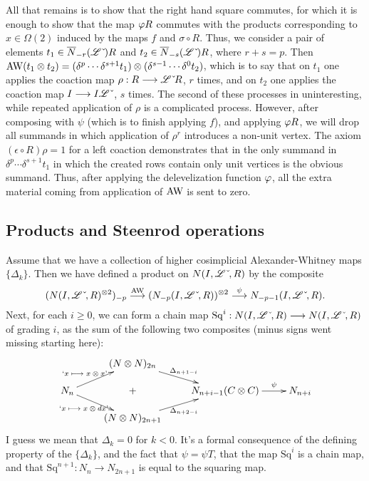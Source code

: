 \documentclass[10pt]{article}
\newcommand{\Sq}{\mathrm{Sq}}
\newcommand{\dual}{\,\check{\,}}
\newcommand{\LieOperad}{\scrL}
\newcommand{\dualLieOperad}{\LieOperad\dual}
\begin{document}
\begin{PRlieKoszulComplexCalculation}
All that remains is to show that the right hand square commutes, for which it is enough to show that the map $\oldphi\circ R$ commutes with the products corresponding to $x\in\Omega(2)$ induced by the maps $f$ and $\sigma\circ R$. Thus, we consider a pair of elements $t_1\in \overline{N}_{-r}(\dualLieOperad)\circ R$ and $t_2\in \overline{N}_{-s}(\dualLieOperad)\circ R$, where $r+s=p$. Then $\textup{AW}(t_1\otimes t_2)=(\delta^{p}\cdots \delta^{s+1}t_1)\otimes (\delta^{s-1}\cdots \delta^{0}t_2)$, which is to say that on $t_1$ one applies the coaction map $\rho:R\to\dualLieOperad\circ R$, $r$ times, and on $t_2$ one applies the coaction map $I\to I\circ \dualLieOperad$, $s$ times. The second of these processes in uninteresting, while repeated application of $\rho$ is a complicated process. However, after composing with $\psi$ (which is to finish applying $f$), and applying $\oldphi\circ R$, we will drop all summands in which application of $\rho^r$ introduces a non-unit vertex. The axiom $(\epsilon\circ R) \rho=1$ for a left coaction demonstrates that in the only summand in $\delta^{p}\cdots \delta^{s+1}t_1$ in which the created rows contain only unit vertices is the obvious summand. Thus, after applying the delevelization function $\oldphi$, all the extra material coming from application of $\textup{AW}$ is sent to zero.

\subsection{Products and Steenrod operations}
Assume that we have a collection of higher cosimplicial Alexander-Whitney maps $\{\Delta_k\}$. Then we have defined a product on $N(I,\dualLieOperad,R)$ by the composite
\[(N(I,\dualLieOperad,R)^{\otimes 2})_{-p}\overset{\textup{AW}}{\to} (N_{-p}(I,\dualLieOperad,R))^{\otimes 2}\overset{\psi}{\to}N_{-p-1}(I,\dualLieOperad,R).\]
Next, for each $i\geq0$, we can form a chain map $\Sq^{i}:N(I,\dualLieOperad,R)\to N(I,\dualLieOperad,R)$ of grading $i$, as the sum of the following two composites (minus signs went missing starting here):
\[\xymatrix@R=4mm{
&%
(N\otimes N)_{2n}
\ar[dr]^-{\Delta_{n+1-i}}
&%
&%
\\%
N_n
\ar[ur]^-{\textup{`$x\mapsto x\otimes x$'}}
\ar[dr]_-{\textup{`$x\mapsto x\otimes dx$'}}&%
+&%
N_{n+i-1}(C\otimes C)
\ar[r]^-{\psi}
&%
N_{n+i}\\%
&%
(N\otimes N)_{2n+1}
\ar[ur]_-{\Delta_{n+2-i}}
&%
&%
}\]
I guess we mean that $\Delta_k=0$ for $k<0$. It's a formal consequence of the defining property of the $\{\Delta_k\}$, and the fact that $\psi=\psi T$, that the map $\Sq^i$ is a chain map, and that $\Sq^{n+1}:N_{n}\to N_{2n+1}$ is equal to the squaring map.


\end{PRlieKoszulComplexCalculation}
\end{document}
